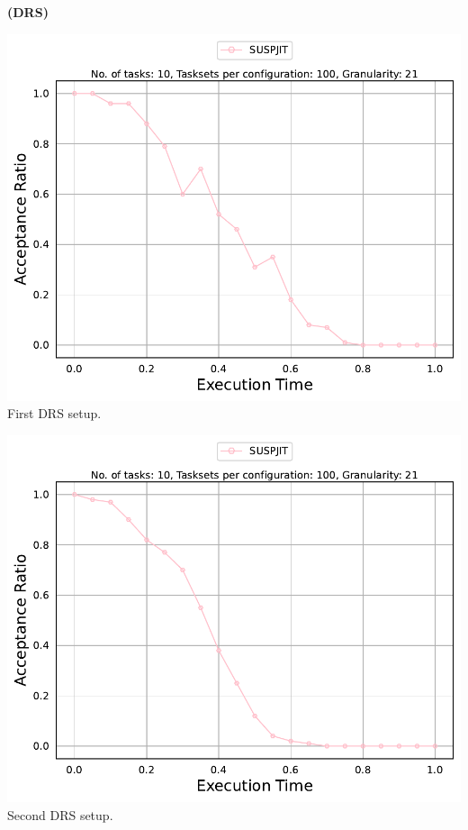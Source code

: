 \documentclass[]{article}
\begin{document}
	\begin{minipage}[t]{0.48\linewidth}
		\centering
		\textbf{(DRS)}
		\vspace{0.3cm}
		
		\includegraphics[width=\linewidth]{SUSPJIT_1stSetup.pdf}
		First DRS setup.
		\vspace{0.3cm}
		
		\includegraphics[width=\linewidth]{SUSPJIT_2ndSetup.pdf}
		Second DRS setup.
		\vspace{0.3cm}
		

\end{minipage}
\end{document}
